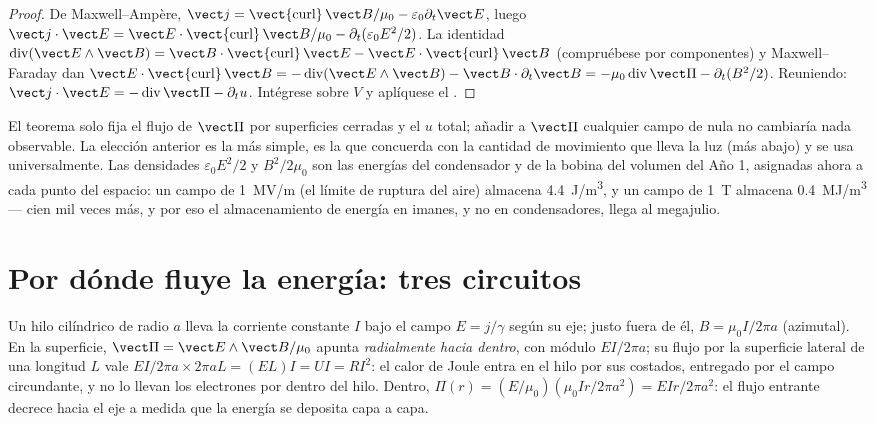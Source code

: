 \begin{proof}
De Maxwell--Ampère, $\vect j = \operatorname{\vect{curl}}\vect B/\mu_0 - \varepsilon_0\partial_t
\vect E$, luego $\vect j\cdot\vect E = \vect E\cdot\operatorname{\vect{curl}}\vect B/\mu_0 -
\partial_t(\varepsilon_0E^2/2)$. La identidad $\operatorname{div}(\vect E\wedge\vect B) = \vect B
\cdot\operatorname{\vect{curl}}\vect E - \vect E\cdot\operatorname{\vect{curl}}\vect B$ (compruébese
por componentes) y Maxwell--Faraday dan $\vect E\cdot\operatorname{\vect{curl}}
\vect B = -\operatorname{div}(\vect E\wedge\vect B) - \vect B\cdot\partial_t\vect B = -\mu_0
\operatorname{div}\vect\Pi - \partial_t(B^2/2)$. Reuniendo: $\vect j\cdot\vect E = -\operatorname{div}
\vect\Pi - \partial_tu$. Intégrese sobre $V$ y aplíquese el .
\end{proof}

\begin{remark}\label{rem:b2:poynting-vector:interpretation}
El teorema solo fija el flujo de $\vect\Pi$ por superficies cerradas y el
$u$ total; añadir a $\vect\Pi$ cualquier campo de  nula no
cambiaría nada observable. La elección anterior es la más simple, es la
que concuerda con la cantidad de movimiento que lleva la luz (más abajo)
y se usa universalmente. Las densidades $\varepsilon_0E^2/2$ y $B^2/2\mu_0$ son
las energías del condensador y de la bobina del volumen del Año 1,
asignadas ahora a cada punto del espacio: un campo de \qty{1}{MV/m} (el
límite de ruptura del aire) almacena \qty{4.4}{J/m^3}, y un campo de \qty{1}{T}
almacena \qty{0.4}{MJ/m^3} --- cien mil veces más, y por eso el
almacenamiento de energía en imanes, y no en condensadores, llega al megajulio.
\end{remark}

\section{Por dónde fluye la energía: tres circuitos}

\begin{example}\label{ex:b2:poynting-vector:wire}
Un hilo cilíndrico de radio $a$ lleva la corriente constante $I$ bajo el
campo $E = j/\gamma$ según su eje; justo fuera de él, $B = \mu_0I/2\pi a$
(azimutal). En la superficie, $\vect\Pi = \vect E\wedge\vect B/\mu_0$ apunta
\emph{radialmente hacia dentro}, con módulo $EI/2\pi a$; su flujo por la
superficie lateral de una longitud $L$ vale $EI/2\pi a\times2\pi aL = (EL)I = UI =
RI^2$: el calor de Joule entra en el hilo por sus costados, entregado por
el campo circundante, y no lo llevan los electrones por dentro del hilo.
Dentro, $\Pi(r) = (E/\mu_0)(\mu_0Ir/2\pi a^2) = EIr/2\pi a^2$: el flujo entrante
decrece hacia el eje a medida que la energía se deposita capa a capa.
\end{example}

